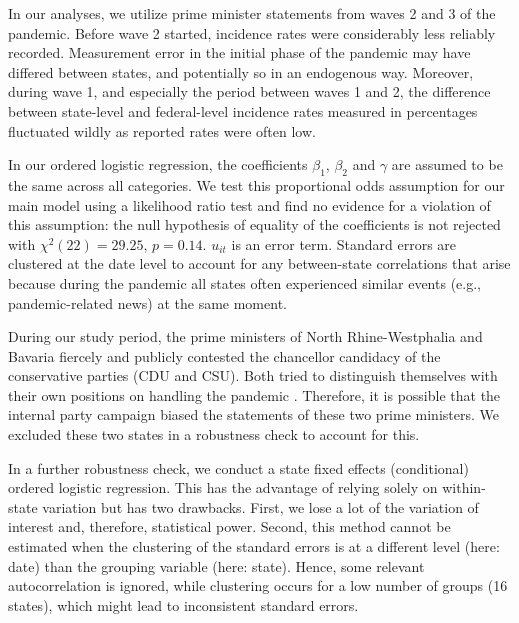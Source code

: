 \documentclass[12pt, abstracton]{scrartcl}
\begin{document}
In our analyses, we utilize prime minister statements from waves 2 and 3 of the pandemic. Before wave 2 started, incidence rates were considerably less reliably recorded. Measurement error in the initial phase of the pandemic may have differed between states, and potentially so in an endogenous way. Moreover, during wave 1, and especially the period between waves 1 and 2, the difference between state-level and federal-level incidence rates measured in percentages fluctuated wildly as reported rates were often low.

In our ordered logistic regression, the coefficients $\beta_1$, $\beta_2$ and $\gamma$ are assumed to be the same across all categories. We test this proportional odds assumption for our main model using a likelihood ratio test \citep{Brant1990} and find no evidence for a violation of this assumption: the null hypothesis of equality of the coefficients is not rejected with $\chi^2 (22) = 29.25$, $p = 0.14$. $u_{it}$ is an error term. Standard errors are clustered at the date level to account for any between-state correlations that arise because during the pandemic all states often experienced similar events (e.g., pandemic-related news) at the same moment.  %

During our study period, the prime ministers of North Rhine-Westphalia and Bavaria fiercely and publicly contested the chancellor candidacy of the conservative parties (CDU and CSU). Both tried to distinguish themselves with their own positions on handling the pandemic \citep{Jun2023}. Therefore, it is possible that the internal party campaign biased the statements of these two prime ministers. We excluded these two states in a robustness check to account for this.

In a further robustness check, we conduct a state fixed effects (conditional) ordered logistic regression. This has the advantage of relying solely on within-state variation but has two drawbacks. First, we lose a lot of the variation of interest and, therefore, statistical power. Second, this method cannot be estimated when the clustering of the standard errors is at a different level (here: date) than the grouping variable (here: state). Hence, some relevant autocorrelation is ignored, while clustering occurs for a low number of groups (16 states), which might lead to inconsistent standard errors.
\end{document}
